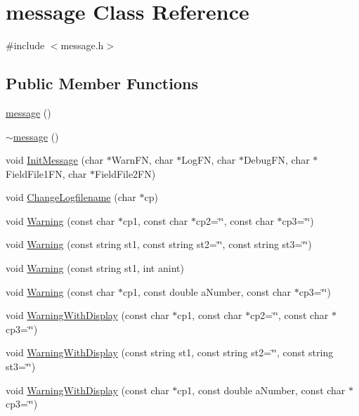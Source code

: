 \hypertarget{classmessage}{
\section{message Class Reference}
\label{classmessage}
}


{\ttfamily \#include $<$message.h$>$}\subsection*{Public Member Functions}
\begin{DoxyCompactItemize}
\item 
\hyperlink{classmessage_a6aefe31fa8ce580fdf7d6c8224a5e445}{message} ()
\item 
\hyperlink{classmessage_a3e20db9559213f6eb3dd15cd83af62be}{$\sim$message} ()
\item 
void \hyperlink{classmessage_ab54d58e7ae577d16bfae5b0f7d97cecb}{InitMessage} (char $\ast$WarnFN, char $\ast$LogFN, char $\ast$DebugFN, char $\ast$FieldFile1FN, char $\ast$FieldFile2FN)
\item 
void \hyperlink{classmessage_a5c0c99587c4270077b545d7b17823051}{ChangeLogfilename} (char $\ast$cp)
\item 
void \hyperlink{classmessage_aacaa1466698a349689502491cf089f72}{Warning} (const char $\ast$cp1, const char $\ast$cp2=\char`\"{}\char`\"{}, const char $\ast$cp3=\char`\"{}\char`\"{})
\item 
void \hyperlink{classmessage_a085906fc256d250ccff79ea965c076cb}{Warning} (const string st1, const string st2=\char`\"{}\char`\"{}, const string st3=\char`\"{}\char`\"{})
\item 
void \hyperlink{classmessage_a0ba3b49320345b5056b1321fe4f6f65e}{Warning} (const string st1, int anint)
\item 
void \hyperlink{classmessage_aa10e99e4b4f6aef0c00f0c5021142042}{Warning} (const char $\ast$cp1, const double aNumber, const char $\ast$cp3=\char`\"{}\char`\"{})
\item 
void \hyperlink{classmessage_afed66d0552f90b4385c5169cf5929907}{WarningWithDisplay} (const char $\ast$cp1, const char $\ast$cp2=\char`\"{}\char`\"{}, const char $\ast$cp3=\char`\"{}\char`\"{})
\item 
void \hyperlink{classmessage_ae2bc870036a86a3301ccc6232f1e424d}{WarningWithDisplay} (const string st1, const string st2=\char`\"{}\char`\"{}, const string st3=\char`\"{}\char`\"{})
\item 
void \hyperlink{classmessage_a1b81970a0e394e69f98825fcc48a0cf7}{WarningWithDisplay} (const char $\ast$cp1, const double aNumber, const char $\ast$cp3=\char`\"{}\char`\"{})

\end{DoxyCompactItemize}
